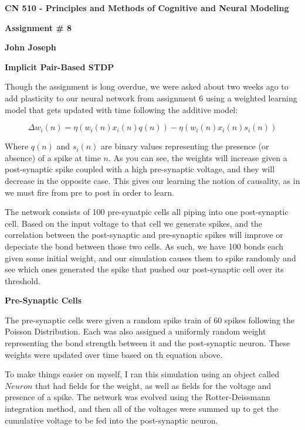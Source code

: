 \documentclass[a4paper,12pt]{article}
\begin{document}
\begin{center}

{\Large\bf CN 510 - Principles and Methods of Cognitive and Neural Modeling}

\bigskip

{\large\bf Assignment \# 8}
\smallskip

{\large\bf John Joseph}
\end{center}

\bigskip
{\bf Implicit Pair-Based STDP}
\bigskip

Though the assignment is long overdue, we were asked about two weeks ago to add plasticity to our neural network from assignment 6 using a weighted learning model that gets updated with time following the additive model:

\begin{equation}
\Delta w_i(n) = \eta(w_i(n)x_i(n)q(n)) - \eta(w_i(n)x_i(n)s_i(n))
\end{equation}

Where $q(n)$ and $s_i(n)$ are binary values representing the presence (or absence) of a spike at time $n$. As you can see, the weights will increase given a post-synaptic spike coupled with a high pre-synaptic voltage, and they will decrease in the opposite case. This gives our learning the notion of causality, as in we must fire from pre to post in order to learn. 

\vspace{2mm}

The network consists of 100 pre-synatpic cells all piping into one post-synaptic cell. Based on the input voltage to that cell we generate spikes, and the correlation between the post-synaptic and pre-synaptic spikes will improve or depeciate the bond between those two cells. As such, we have 100 bonds each given some initial weight, and our simulation causes them to spike randomly and see which ones generated the spike that pushed our post-synaptic cell over its threshold.

\bigskip
{\bf Pre-Synaptic Cells}
\bigskip

The pre-synaptic cells were given a random spike train of 60 spikes following the Poisson Distribution. Each was also assigned a uniformly random weight representing the bond strength between it and the post-synaptic neuron. These weights were updated over time based on th equation above. 

\vspace{2mm}

To make things easier on myself, I ran this simulation using an object called $Neuron$ that had fields for the weight, as well as fields for the voltage and presence of a spike. The network was evolved using the Rotter-Deissmann integration method, and then all of the voltages were summed up to get the cumulative voltage to be fed into the post-synaptic neuron. 
\end{document}
